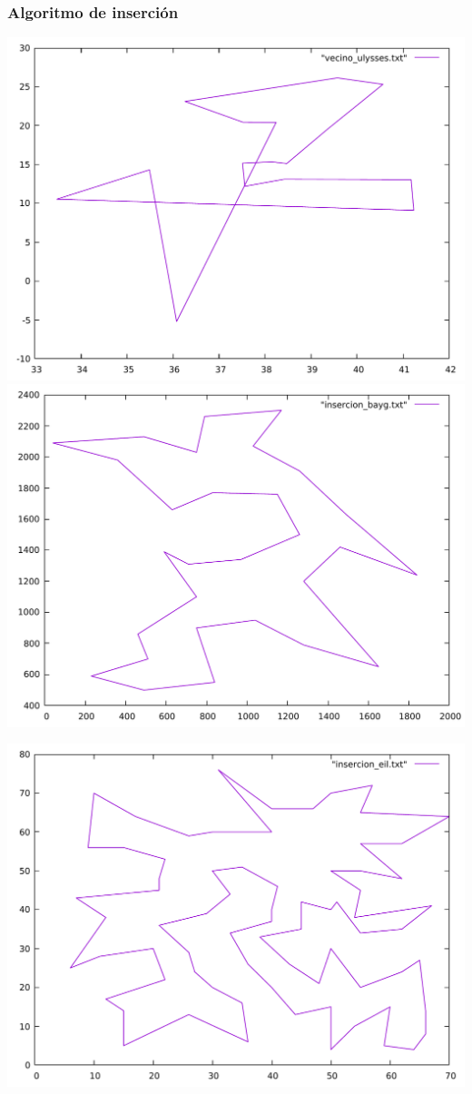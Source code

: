\documentclass[13pt]{beamer}
\begin{document}
	\begin{frame}
		\frametitle{Algoritmo de inserción}
			\includegraphics[scale=0.2]{../src/vecino_ulysses.pdf}
			\includegraphics[scale=0.2]{../src/insercion_bayg.pdf}
			\begin{center}
				\includegraphics[scale=0.2]{../src/insercion_eil.pdf}
			\end{center}
	\end{frame}
\end{document}
